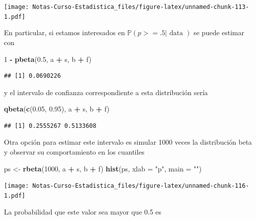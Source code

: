 \documentclass[
  12pt,
]{book}
\newenvironment{Shaded}{\begin{snugshade}}{\end{snugshade}}
\newcommand{\DataTypeTok}[1]{\textcolor[rgb]{0.13,0.29,0.53}{#1}}
\newcommand{\DecValTok}[1]{\textcolor[rgb]{0.00,0.00,0.81}{#1}}
\newcommand{\FloatTok}[1]{\textcolor[rgb]{0.00,0.00,0.81}{#1}}
\newcommand{\KeywordTok}[1]{\textcolor[rgb]{0.13,0.29,0.53}{\textbf{#1}}}
\newcommand{\NormalTok}[1]{#1}
\newcommand{\OperatorTok}[1]{\textcolor[rgb]{0.81,0.36,0.00}{\textbf{#1}}}
\newcommand{\StringTok}[1]{\textcolor[rgb]{0.31,0.60,0.02}{#1}}
\theoremstyle{definition}
\theoremstyle{definition}
\theoremstyle{definition}
\theoremstyle{remark}
\begin{document}
\texttt{[image: Notas-Curso-Estadistica\_files/figure-latex/unnamed-chunk-113-1.pdf]}

En particular, si estamos interesados en \(\mathbb{P}(p>=.5 | \text {  data })\) se puede estimar con

\begin{Shaded}
\begin{Highlighting}[]
\DecValTok{1} \OperatorTok{-}\StringTok{ }\KeywordTok{pbeta}\NormalTok{(}\FloatTok{0.5}\NormalTok{, a }\OperatorTok{+}\StringTok{ }\NormalTok{s, b }\OperatorTok{+}\StringTok{ }\NormalTok{f)}
\end{Highlighting}
\end{Shaded}

\begin{verbatim}
## [1] 0.0690226
\end{verbatim}

y el intervalo de confianza correspondiente a esta distribución sería

\begin{Shaded}
\begin{Highlighting}[]
\KeywordTok{qbeta}\NormalTok{(}\KeywordTok{c}\NormalTok{(}\FloatTok{0.05}\NormalTok{, }\FloatTok{0.95}\NormalTok{), a }\OperatorTok{+}\StringTok{ }\NormalTok{s, b }\OperatorTok{+}\StringTok{ }\NormalTok{f)}
\end{Highlighting}
\end{Shaded}

\begin{verbatim}
## [1] 0.2555267 0.5133608
\end{verbatim}

Otra opción para estimar este intervalo es simular 1000 veces la
distribución beta y observar su comportamiento en los cuantiles

\begin{Shaded}
\begin{Highlighting}[]
\NormalTok{ps <-}\StringTok{ }\KeywordTok{rbeta}\NormalTok{(}\DecValTok{1000}\NormalTok{, a }\OperatorTok{+}\StringTok{ }\NormalTok{s, b }\OperatorTok{+}\StringTok{ }\NormalTok{f)}
\KeywordTok{hist}\NormalTok{(ps, }\DataTypeTok{xlab =} \StringTok{"p"}\NormalTok{, }\DataTypeTok{main =} \StringTok{""}\NormalTok{)}
\end{Highlighting}
\end{Shaded}

\texttt{[image: Notas-Curso-Estadistica\_files/figure-latex/unnamed-chunk-116-1.pdf]}

La probabilidad que este valor sea mayor que 0.5 es
\end{document}
